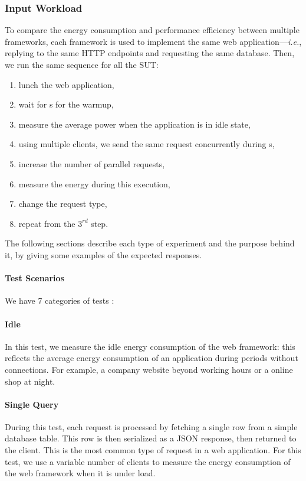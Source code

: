 \subsubsection{Input Workload}
To compare the energy consumption and performance efficiency between multiple frameworks, each framework is used to implement the same web application---\emph{i.e.}, replying to the same HTTP endpoints and requesting the same database. Then, we run the same sequence for all the SUT:
\begin{enumerate}
    \item lunch the web application,
    \item wait for \duration s for the warmup,
    \item measure the average power when the application is in idle state,
    \item using multiple clients, we send the same request concurrently during \duration s,
    \item increase the number of parallel requests,
    \item measure the energy during this execution,
    \item change the request type,
    \item repeat from the $3^{rd}$ step.
\end{enumerate}

The following sections describe each type of experiment and the purpose behind it, by giving some examples of the expected responses.

\paragraph{Test Scenarios}
We have 7 categories of tests :
\paragraph{Idle}
In this test, we measure the idle energy consumption of the web framework: this reflects the average energy consumption of an application during periods without connections.
For example, a company website beyond working hours or a online shop at night.

\paragraph{Single Query}
During this test, each request is processed by fetching a single row from a simple database table.
This row is then serialized as a JSON response, then returned to the client.
This is the most common type of request in a web application.
For this test, we use a variable number of clients to measure the energy consumption of the web framework when it is under load.

